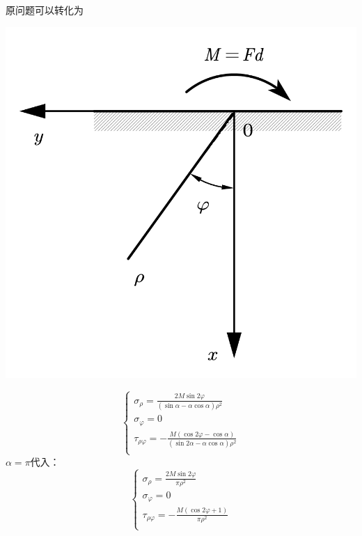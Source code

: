 \begin{remark}
	原问题可以转化为\\
\centerline{\includegraphics[scale=0.45]{figure/4-16.png}}
\[\begin{cases}
\sigma _{\rho}=\frac{2M\sin 2\varphi}{\left( \sin \alpha -\alpha \cos \alpha \right) \rho ^2}\\
\sigma _{\varphi}=0\\
\tau _{\rho \varphi}=-\frac{M\left( \cos 2\varphi -\cos \alpha \right)}{\left( \sin 2\alpha -\alpha \cos \alpha \right) \rho ^2}\\
\end{cases}\]
$\alpha =\pi $代入：\[\begin{cases}
\sigma _{\rho}=\frac{2M\sin 2\varphi}{\pi \rho ^2}\\
\sigma _{\varphi}=0\\
\tau _{\rho \varphi}=-\frac{M\left( \cos 2\varphi +1 \right)}{\pi \rho ^2}\\
\end{cases}\]
\end{remark}
